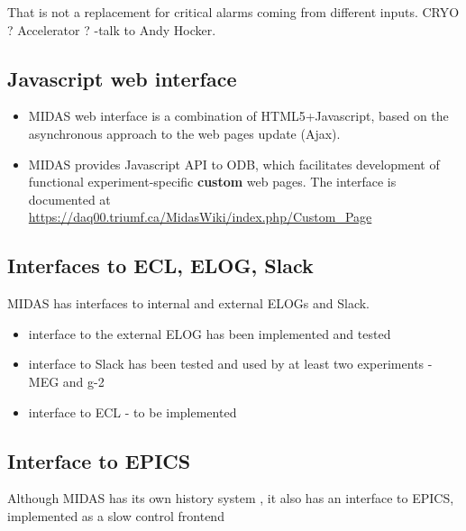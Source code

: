 That is not a replacement for critical alarms coming from different inputs.
CRYO ? Accelerator ? -{\red talk to Andy Hocker.}


\subsection{Javascript web interface}

\begin{itemize}
\item 
  MIDAS web interface is a combination of HTML5+Javascript, based on the
  asynchronous approach to the web pages update (Ajax).
\item 
  MIDAS provides Javascript API to ODB, which facilitates development of
  functional experiment-specific {\bf custom} web pages.
  The interface is documented at \\
  \href{https://daq00.triumf.ca/MidasWiki/index.php/Custom\_Page}
  {\blue https://daq00.triumf.ca/MidasWiki/index.php/Custom\_Page}
\end{itemize}


\subsection{Interfaces to ECL, ELOG, Slack}

MIDAS has interfaces to internal and external ELOGs and Slack.
\begin{itemize}
\item
  interface to the external ELOG has been implemented and tested
\item
  interface to Slack has been tested and used by at least two experiments - MEG and g-2
\item
  interface to ECL - to be implemented
\end{itemize}


\subsection{Interface to EPICS}

Although MIDAS has its own history system , it also has an interface to EPICS,
implemented as a slow control frontend



